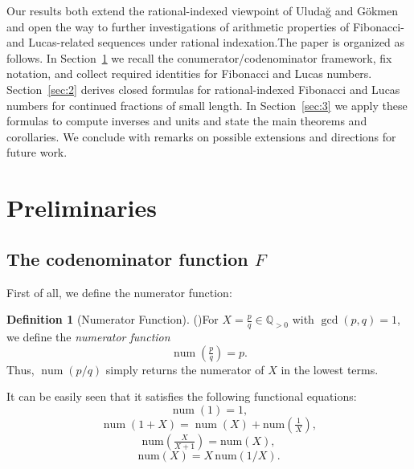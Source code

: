 \documentclass[11pt,reqno]{amsart}
\numberwithin{equation}{section}
\numberwithin{table}{section}
\numberwithin{figure}{section}
\DeclareMathOperator{\num}{num}
\theoremstyle{plain}
\theoremstyle{definition}
\newtheorem{definition}[thm]{Definition}
\theoremstyle{remark}
\begin{document}
Our results both extend the rational-indexed viewpoint of Uludağ and Gökmen and open the way to further investigations of arithmetic properties of Fibonacci- and Lucas-related sequences under rational indexation.The paper is organized as follows. In Section~\ref{sec:1} we recall the conumerator/codenominator framework, fix notation, and collect required identities for Fibonacci and Lucas numbers. Section~\ref{sec:2} derives closed formulas for rational-indexed Fibonacci and Lucas numbers for continued fractions of small length. In Section~\ref{sec:3} we apply these formulas to compute inverses and units and state the main theorems and corollaries. We conclude with remarks on possible extensions and directions for future work.


\section{Preliminaries}\label{sec:1}\subsection{The codenominator function $F$}First of all, we define the numerator function:
\begin{definition}[Numerator Function] {\normalfont(\cite{ULUDAG2022103192})}For $X = \tfrac{p}{q}\in\mathbb{Q}_{>0}$ with $\gcd (p, q) = 1$, we define the \emph{numerator function}	\begin{equation*}		\num\!\left(\tfrac{p}{q}\right) = p.	\end{equation*}	Thus, $\num(p/q)$ simply returns the numerator of $X$ in the lowest terms.\end{definition}



It can be easily seen that it satisfies the following functional equations:\begin{equation}	\num(1) = 1,\end{equation}\begin{equation}\num(1+X) =\num(X) + \mathrm{num}\!\left(\tfrac{1}{X}\right),\end{equation}\begin{equation}	\mathrm{num}\!\left(\tfrac{X}{X+1}\right) =\mathrm{num}(X),\end{equation}\begin{equation}	\mathrm{num}(X) = X \, \mathrm{num}(1/X).\end{equation}
\end{document}
